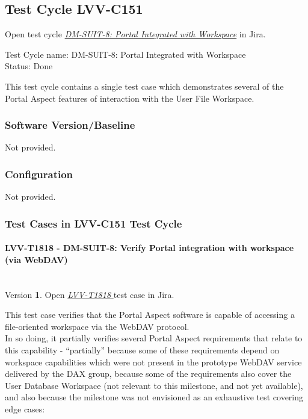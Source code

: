 \documentclass[DM,lsstdraft,STR,toc]{lsstdoc}
\begin{document}
\subsection{Test Cycle LVV-C151 }

Open test cycle {\it \href{https://jira.lsstcorp.org/secure/Tests.jspa#/testrun/LVV-C151}{DM-SUIT-8: Portal Integrated with Workspace}} in Jira.

Test Cycle name: DM-SUIT-8: Portal Integrated with Workspace\\
Status: Done

This test cycle contains a single test case which demonstrates several
of the Portal Aspect features of interaction with the User File
Workspace.

\subsubsection{Software Version/Baseline}
Not provided.

\subsubsection{Configuration}
Not provided.

\subsubsection{Test Cases in LVV-C151 Test Cycle}

\paragraph{ LVV-T1818 - DM-SUIT-8: Verify Portal integration with workspace (via WebDAV) }\mbox{}\\

Version \textbf{1}.
Open  \href{https://jira.lsstcorp.org/secure/Tests.jspa#/testCase/LVV-T1818}{\textit{ LVV-T1818 } }
test case in Jira.

This test case verifies that the Portal Aspect software is capable of
accessing a file-oriented workspace via the WebDAV
protocol.\\[2\baselineskip]In so doing, it partially verifies several
Portal Aspect requirements that relate to this capability -
``partially'' because some of these requirements depend on workspace
capabilities which were not present in the prototype WebDAV service
delivered by the DAX group, because some of the requirements also cover
the User Database Workspace (not relevant to this milestone, and not yet
available), and also because the milestone was not envisioned as an
exhaustive test covering edge cases:
\end{document}

